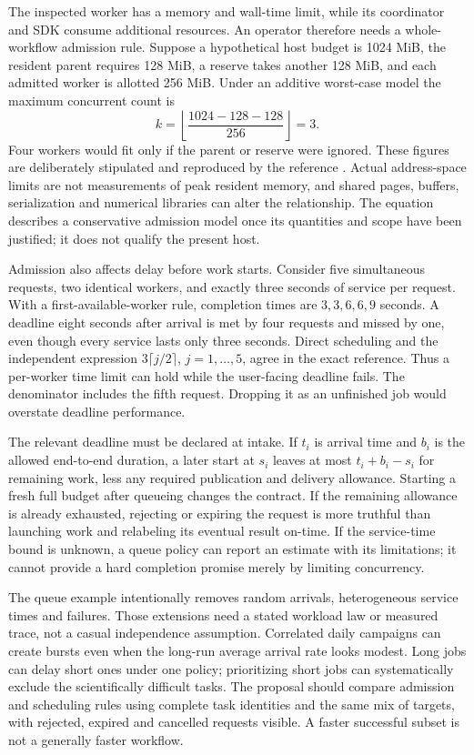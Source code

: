 The inspected worker has a memory and wall-time limit, while its coordinator
and SDK consume additional resources. An operator therefore needs a
whole-workflow admission rule. Suppose a hypothetical host budget is
1024 MiB, the resident parent requires 128 MiB, a reserve takes another
128 MiB, and each admitted worker is allotted 256 MiB. Under an additive
worst-case model the maximum concurrent count is
\begin{equation}
 k=\left\lfloor\frac{1024-128-128}{256}\right\rfloor=3.
 \label{exec17:i4-memory}
\end{equation}
Four workers would fit only if the parent or reserve were ignored. These
figures are deliberately stipulated and reproduced by the reference
\citep{exec17_integration_review_reference}. Actual address-space limits are
not measurements of peak resident memory, and shared pages, buffers,
serialization and numerical libraries can alter the relationship. The
equation describes a conservative admission model once its quantities and
scope have been justified; it does not qualify the present host.

Admission also affects delay before work starts. Consider five simultaneous
requests, two identical workers, and exactly three seconds of service per
request. With a first-available-worker rule, completion times are
$3,3,6,6,9$ seconds. A deadline eight seconds after arrival is met by four
requests and missed by one, even though every service lasts only three
seconds. Direct scheduling and the independent expression
$3\lceil j/2\rceil$, $j=1,\ldots,5$, agree in the exact reference.
Thus a per-worker time limit can hold while the user-facing deadline fails.
The denominator includes the fifth request. Dropping it as an unfinished
job would overstate deadline performance.

The relevant deadline must be declared at intake. If $t_i$ is arrival time
and $b_i$ is the allowed end-to-end duration, a later start at $s_i$ leaves
at most $t_i+b_i-s_i$ for remaining work, less any required publication and
delivery allowance. Starting a fresh full budget after queueing changes the
contract. If the remaining allowance is already exhausted, rejecting or
expiring the request is more truthful than launching work and relabeling
its eventual result on-time. If the service-time bound is unknown, a queue
policy can report an estimate with its limitations; it cannot provide a
hard completion promise merely by limiting concurrency.

The queue example intentionally removes random arrivals, heterogeneous
service times and failures. Those extensions need a stated workload law or
measured trace, not a casual independence assumption. Correlated daily
campaigns can create bursts even when the long-run average arrival rate
looks modest. Long jobs can delay short ones under one policy; prioritizing
short jobs can systematically exclude the scientifically difficult tasks.
The proposal should compare admission and scheduling rules using complete
task identities and the same mix of targets, with rejected, expired and
cancelled requests visible. A faster successful subset is not a generally
faster workflow.

